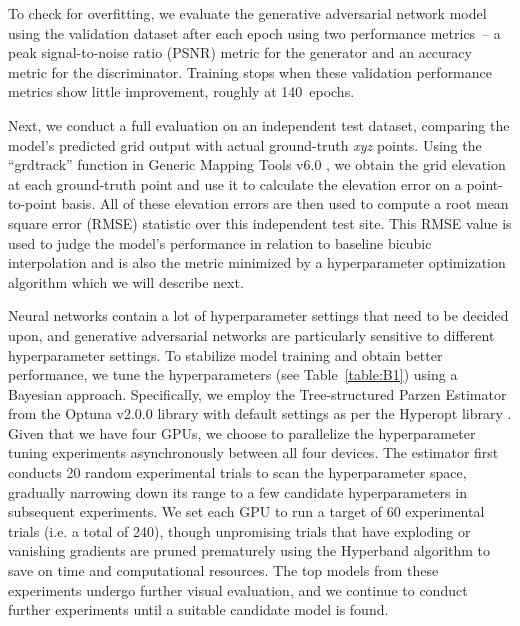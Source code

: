 \begin{appendices}
To check for overfitting, we evaluate the generative adversarial network model using the validation dataset after each epoch using two performance metrics~-- a peak signal-to-noise ratio (PSNR) metric for the generator and an accuracy metric for the discriminator.
Training stops when these validation performance metrics show little improvement, roughly at 140~epochs.

Next, we conduct a full evaluation on an independent test dataset, comparing the model's predicted grid output with actual ground-truth \textit{xyz} points.
Using the ``grdtrack'' function in Generic Mapping Tools v6.0 \citep{WesselGenericMappingTools2019}, we obtain the grid elevation at each ground-truth point and use it to calculate the elevation error on a point-to-point basis.
All of these elevation errors are then used to compute a root mean square error (RMSE) statistic over this independent test site.
This RMSE value is used to judge the model's performance in relation to baseline bicubic interpolation and is also the metric minimized by a hyperparameter optimization algorithm which we will describe next.

Neural networks contain a lot of hyperparameter settings that need to be decided upon, and generative adversarial networks are particularly sensitive to different hyperparameter settings.
To stabilize model training and obtain better performance, we tune the hyperparameters (see Table~\ref{table:B1}) using a Bayesian approach.
Specifically, we employ the Tree-structured Parzen Estimator \citep{BergstraAlgorithmsHyperparameterOptimization2011} from the Optuna v2.0.0 \citep{AkibaOptunaNextgenerationHyperparameter2019} library with default settings as per the Hyperopt library \citep{BergstraHyperoptPythonlibrary2015}.
Given that we have four GPUs, we choose to parallelize the hyperparameter tuning experiments asynchronously between all four devices.
The estimator first conducts 20 random experimental trials to scan the hyperparameter space, gradually narrowing down its range to a few candidate hyperparameters in subsequent experiments.
We set each GPU to run a target of 60 experimental trials (i.e. a total of 240), though unpromising trials that have exploding or vanishing gradients are pruned prematurely using the Hyperband algorithm \citep{LiHyperbandNovelBanditBased2018} to save on time and computational resources.
The top models from these experiments undergo further visual evaluation, and we continue to conduct further experiments until a suitable candidate model is found.

\end{appendices}




